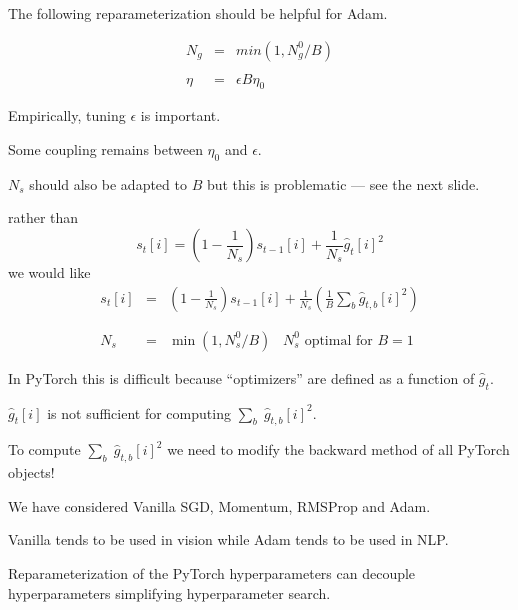 {

The following reparameterization should be helpful for Adam.

\begin{eqnarray*}
N_g & = & min(1,N^0_g/B) \\
\\
\eta & = & \epsilon B \eta_0
\end{eqnarray*}

\vfill
Empirically, tuning $\epsilon$ is important.

\vfill
Some coupling remains between $\eta_0$ and $\epsilon$.

\vfill
$N_s$ should also be adapted to $B$ but this is problematic --- see the next slide.


rather than
$$s_t[i] = \left(1-\frac{1}{N_s}\right) s_{t-1}[i] + \frac{1}{N_s} \hat{g}_t[i]^2$$
\vfill
we would like
\begin{eqnarray*}
s_t[i] & = &  \left(1-\frac{1}{N_s}\right) s_{t-1}[i] + \frac{1}{N_s} \left(\frac{1}{B} \sum_b \hat{g}_{t,b}[i]^2\right) \\
\\
\\
N_s & = & \min\left(1,N^0_s/B\right)\;\;\;\mbox{$N^0_s$ optimal for $B=1$}
\end{eqnarray*}


In PyTorch this is difficult because ``optimizers'' are defined as a function of $\hat{g}_t$.

\vfill
$\hat{g}_t[i]$ is not sufficient for computing $\sum_b \;\hat{g}_{t,b}[i]^2$.


\vfill
To compute $\sum_b \;\hat{g}_{t,b}[i]^2$ we need to modify the backward method of all PyTorch objects!


We have considered Vanilla SGD, Momentum, RMSProp and Adam.

\vfill
Vanilla tends to be used in vision while Adam tends to be used in NLP.

\vfill
Reparameterization of the PyTorch hyperparameters can decouple hyperparameters simplifying hyperparameter search.



} 

